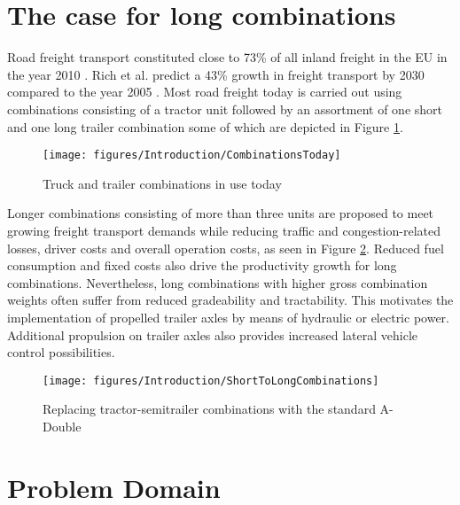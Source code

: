 \documentclass[MastersThesis.tex]{subfiles}
\begin{document}
\section{The case for long combinations}

	Road freight transport constituted close to 73\% of all inland freight in the EU in the year 2010 \cite{RoadFreight2010}. Rich et al. predict a 43\% growth in freight transport by 2030 compared to the year 2005 \cite{RoadFreight20XX}. Most road freight today is carried out using combinations consisting of a tractor unit followed by an assortment of one short and one long trailer combination some of which are depicted in Figure \ref{CombinationsToday}.\\ 

	\begin{figure}[ht!]
		\begin{center}
			\texttt{[image: figures/Introduction/CombinationsToday]}
		\end{center}
		\caption{Truck and trailer combinations in use today}
		\label{CombinationsToday}
	\end{figure}

	Longer combinations consisting of more than three units are proposed to meet growing freight transport demands while reducing traffic and congestion-related losses, driver costs and overall operation costs, as seen in Figure \ref{ShortToLongCombinations}. Reduced fuel consumption and fixed costs also drive the productivity growth for long combinations. Nevertheless, long combinations with higher gross combination weights often suffer from reduced gradeability and tractability. This motivates the implementation of propelled trailer axles by means of hydraulic or electric power. Additional propulsion on trailer axles also provides increased lateral vehicle control possibilities.\\

	\begin{figure}[ht!]
		\begin{center}
			\texttt{[image: figures/Introduction/ShortToLongCombinations]}
		\end{center}
		\caption{Replacing tractor-semitrailer combinations with the standard A-Double}
		\label{ShortToLongCombinations}
	\end{figure}

\section{Problem Domain}
\end{document}

